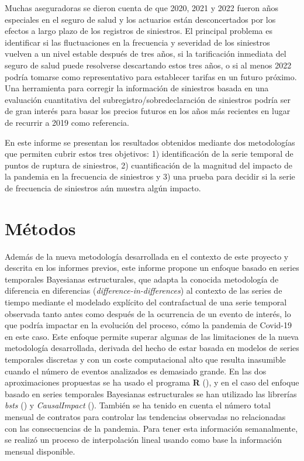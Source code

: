 \documentclass[12pt,twoside]{article} %
\begin{document}
Muchas aseguradoras se dieron cuenta de que 2020, 2021 y 2022 fueron años especiales en el seguro de salud y los actuarios están desconcertados por los efectos a largo plazo de los registros de siniestros. El principal problema es identificar si las fluctuaciones en la frecuencia y severidad de los siniestros vuelven a un nivel estable después de tres años, si la tarificación inmediata del seguro de salud puede resolverse descartando estos tres años, o si al menos 2022 podría tomarse como representativo para establecer tarifas en un futuro próximo. Una herramienta para corregir la información de siniestros basada en una evaluación cuantitativa del subregistro/sobredeclaración de siniestros podría ser de gran interés para basar los precios futuros en los años más recientes en lugar de recurrir a 2019 como referencia.

En este informe se presentan los resultados obtenidos mediante dos metodologías que permiten cubrir estos tres objetivos: 1) identificación de la serie temporal de puntos de ruptura de siniestros, 2) cuantificación de la magnitud del impacto de la pandemia en la frecuencia de siniestros y 3) una prueba para decidir si la serie de frecuencia de siniestros aún muestra algún impacto.

\section{Métodos}
Además de la nueva metodología desarrollada en el contexto de este proyecto y descrita en los informes previos, este informe propone un enfoque basado en series temporales Bayesianas estructurales, que adapta la conocida metodología de diferencia en diferencias (\textit{difference-in-differences}) al contexto de las series de tiempo mediante el modelado explícito del contrafactual de una serie temporal observada tanto antes como después de la ocurrencia de un evento de interés, lo que podría impactar en la evolución del proceso, cómo la pandemia de Covid-19 en este caso. Este enfoque permite superar algunas de las limitaciones de la nueva metodología desarrollada, derivada del hecho de estar basada en modelos de series temporales discretas y con un coste computacional alto que resulta inasumible cuando el número de eventos analizados es demasiado grande. En las dos aproximaciones propuestas se ha usado el programa \textbf{R} (\cite{r_core_team_r_2019}), y en el caso del enfoque basado en series temporales Bayesianas estructurales se han utilizado las librerías \textit{bsts} (\cite{scott_predicting_nodate}) y \textit{CausalImpact} (\cite{brodersen_inferring_2015}). También se ha tenido en cuenta el número total mensual de contratos para controlar las tendencias observadas no relacionadas con las consecuencias de la pandemia. Para tener esta información semanalmente, se realizó un proceso de interpolación lineal usando como base la información mensual disponible.
\end{document}
